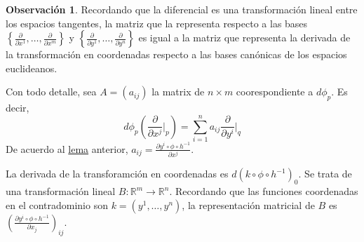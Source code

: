 \documentclass[spanish]{book}
\theoremstyle{definition}
\newtheorem*{obs}{Observación}
\newcommand{\R}{\mathbb{R}}
\begin{document}
\begin{obs}\label{obs:dif-mat}
	Recordando que la diferencial es una transformación lineal entre los espacios tangentes, la matriz que la representa respecto a las bases $\left\{ \frac{\partial}{\partial x^1},\ldots,\frac{\partial}{\partial x^m}\right\}$ y $\left\{\frac{\partial}{\partial y^1},\ldots,\frac{\partial}{\partial y^n}\right\}$ es igual a la matriz que representa la derivada de la transformación en coordenadas respecto a las bases canónicas de los espacios euclideanos.
	
	Con todo detalle, sea $A=(a_{ij})$ la matrix de $n\times m$ coorespondiente a $d\phi_p$. Es decir,
	\[d\phi_p\left(\frac{\partial}{\partial x^j}\Big|_p\right)=\sum_{i=1}^na_{ij}\frac{\partial}{\partial y^i}\Big|_q\]
	De acuerdo al \hyperref[lema:dif-coord]{lema} anterior, $a_{ij}=\frac{\partial y^i\circ\phi\circ h^{-1}}{\partial x^j}$.
	
	La derivada de la transforamción en coordenadas es $d(k\circ\phi\circ h^{-1})_0$. Se trata de una transformación lineal $B:\R^m\to\R^n$. Recordando que las funciones coordenadas en el contradominio son $k=(y^1,\ldots,y^n)$, la representación matricial de $B$ es $\left(\frac{\partial y^i\circ\phi\circ h^{-1}}{\partial x_j}\right)_{ij}$.
\end{obs}
\end{document}
